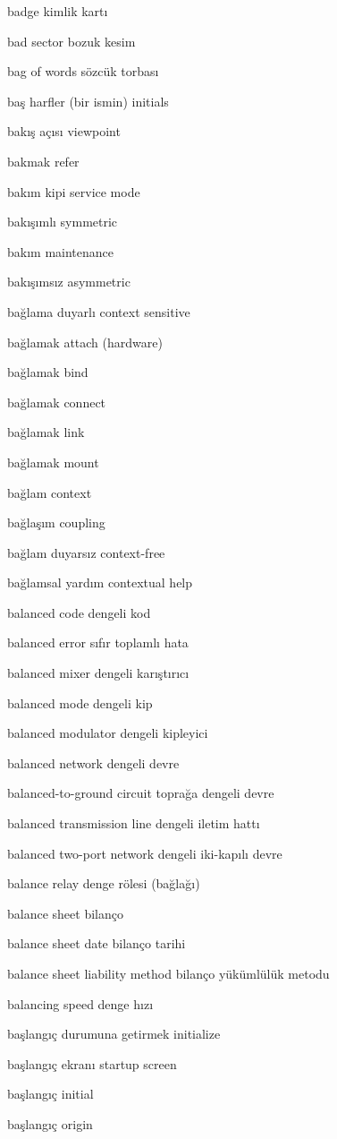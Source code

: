 \documentclass[12pt,fleqn]{article}\usepackage{../../common}
\begin{document}
badge kimlik kartı

bad sector bozuk kesim

bag of words sözcük torbası

baş harfler (bir ismin) initials

bakış açısı viewpoint

bakmak refer

bakım kipi service mode

bakışımlı symmetric

bakım maintenance

bakışımsız asymmetric

bağlama duyarlı context sensitive

bağlamak attach (hardware)

bağlamak bind

bağlamak connect

bağlamak link

bağlamak mount

bağlam context

bağlaşım coupling

bağlam duyarsız context-free

bağlamsal yardım contextual help

balanced code dengeli kod

balanced error sıfır toplamlı hata

balanced mixer dengeli karıştırıcı

balanced mode dengeli kip

balanced modulator dengeli kipleyici

balanced network dengeli devre

balanced-to-ground circuit toprağa dengeli devre

balanced transmission line dengeli iletim hattı

balanced two-port network dengeli iki-kapılı devre

balance relay denge rölesi (bağlağı)

balance sheet bilanço

balance sheet date bilanço tarihi

balance sheet liability method bilanço yükümlülük metodu

balancing speed denge hızı

başlangıç durumuna getirmek initialize

başlangıç ekranı startup screen

başlangıç initial

başlangıç origin
\end{document}
